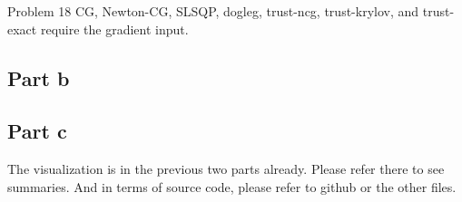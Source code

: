 \documentclass[12pt]{article}
\begin{document}
\begin{section}{Problem 18}
	CG, Newton-CG, SLSQP, dogleg, trust-ncg, trust-krylov, and trust-exact require the gradient input. 
	\subsection{Part b}
	
	
	\subsection{Part c}
	The visualization is in the previous two parts already. Please refer there to see summaries. And in terms of source code, please refer to github or the other files. 
\end{section}
\end{document}
